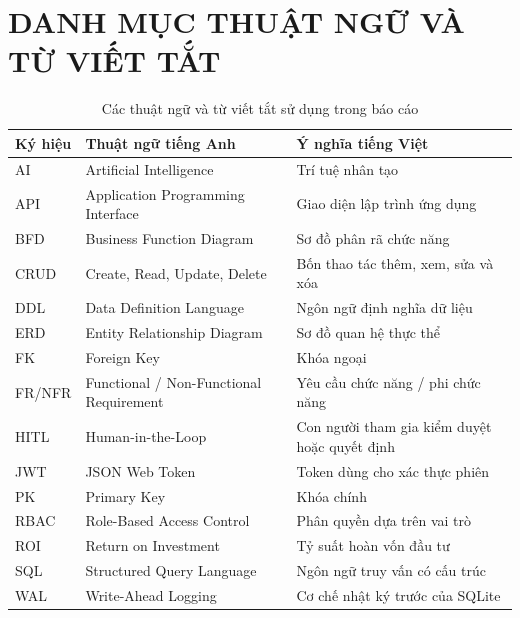 \chapter*{DANH MỤC THUẬT NGỮ VÀ TỪ VIẾT TẮT}

\begin{table}[h!]
\centering
\small
\caption*{Các thuật ngữ và từ viết tắt sử dụng trong báo cáo}
\begin{tabularx}{\textwidth}{|C{1.8cm}|L{5.1cm}|Y|}
\hline
\textbf{Ký hiệu} & \textbf{Thuật ngữ tiếng Anh} & \textbf{Ý nghĩa tiếng Việt}\\\hline
AI & Artificial Intelligence & Trí tuệ nhân tạo\\\hline
API & Application Programming Interface & Giao diện lập trình ứng dụng\\\hline
BFD & Business Function Diagram & Sơ đồ phân rã chức năng\\\hline
CRUD & Create, Read, Update, Delete & Bốn thao tác thêm, xem, sửa và xóa\\\hline
DDL & Data Definition Language & Ngôn ngữ định nghĩa dữ liệu\\\hline
ERD & Entity Relationship Diagram & Sơ đồ quan hệ thực thể\\\hline
FK & Foreign Key & Khóa ngoại\\\hline
FR/NFR & Functional / Non-Functional Requirement & Yêu cầu chức năng / phi chức năng\\\hline
HITL & Human-in-the-Loop & Con người tham gia kiểm duyệt hoặc quyết định\\\hline
JWT & JSON Web Token & Token dùng cho xác thực phiên\\\hline
PK & Primary Key & Khóa chính\\\hline
RBAC & Role-Based Access Control & Phân quyền dựa trên vai trò\\\hline
ROI & Return on Investment & Tỷ suất hoàn vốn đầu tư\\\hline
SQL & Structured Query Language & Ngôn ngữ truy vấn có cấu trúc\\\hline
WAL & Write-Ahead Logging & Cơ chế nhật ký trước của SQLite\\\hline
\end{tabularx}
\end{table}
